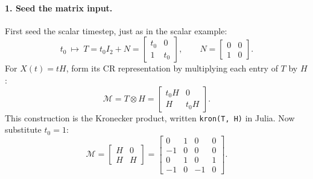 \documentclass[11pt]{article}
\begin{document}
\paragraph{1. Seed the matrix input.}
First seed the scalar timestep, just as in the scalar example:
\[
 t_0\ \longmapsto\ T=t_0I_2+N
 =\begin{bmatrix}t_0&0\\1&t_0\end{bmatrix},\qquad
 N=\begin{bmatrix}0&0\\1&0\end{bmatrix}.
\]
For $X(t)=tH$, form its CR representation by multiplying each entry of $T$
by $H$:
\[
 \mathcal M=T\otimes H
 =\begin{bmatrix}t_0H&0\\H&t_0H\end{bmatrix}.
\]
This construction is the Kronecker product, written \texttt{kron(T, H)} in
Julia. Now substitute $t_0=1$:
\[
 \boxed{\mathcal M=\begin{bmatrix}H&0\\H&H\end{bmatrix}}
 =\left[\begin{array}{cc|cc}
   0&1&0&0\\-1&0&0&0\\\hline
   0&1&0&1\\-1&0&-1&0
 \end{array}\right].
\]
\end{document}
